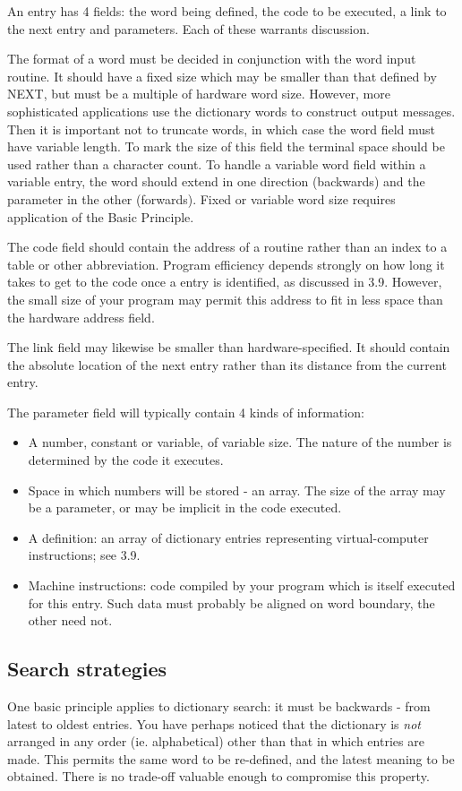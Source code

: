\documentclass[b5paper, oneside]{book}
\begin{document}
An entry has 4 fields: the word being defined, the code to be executed, a link to the next entry and parameters. Each of these warrants discussion.

The format of a word must be decided in conjunction with the word input routine. It should have a fixed size which may be smaller than that defined by NEXT, but must be a multiple of hardware word size. However, more sophisticated applications use the dictionary words to construct output messages. Then it is important not to truncate words, in which case the word field must have variable length. To mark the size of this field the terminal space should be used rather than a character count. To handle a variable word field within a variable entry, the word should extend in one direction (backwards) and the parameter in the other (forwards). Fixed or variable word size requires application of the Basic Principle.

The code field should contain the address of a routine rather than an index to a table or other abbreviation. Program efficiency depends strongly on how long it takes to get to the code once a entry is identified, as discussed in 3.9. However, the small size of your program may permit this address to fit in less space than the hardware address field.

The link field may likewise be smaller than hardware-specified. It should contain the absolute location of the next entry rather than its distance from the current entry.

The parameter field will typically contain 4 kinds of information:\begin{itemize}
   \item A number, constant or variable, of variable size. The nature of the number is determined by the code it executes.
   \item Space in which numbers will be stored - an array. The size of the array may be a parameter, or may be implicit in the code executed.
   \item A definition: an array of dictionary entries representing virtual-computer instructions; see 3.9.
   \item Machine instructions: code compiled by your program which is itself executed for this entry. Such data must probably be aligned on word
 boundary, the other need not.\end{itemize}

\subsection{Search strategies}
One basic principle applies to dictionary search: it must be backwards - from latest to oldest entries. You have perhaps noticed that the dictionary is {\em not} arranged in any order (ie. alphabetical) other than that in which entries are made. This permits the same word to be re-defined, and the latest meaning to be obtained. There is no trade-off valuable enough to compromise this property.
\end{document}
